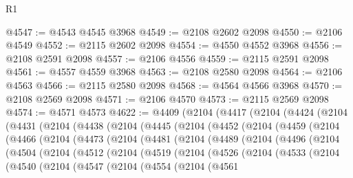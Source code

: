 \begin{lexlean}{R1}
\begin{coremodule}
@4547 := @4543 @4545 @3968
@4549 := @2108 @2602 @2098
@4550 := @2106 @4549
@4552 := @2115 @2602 @2098
@4554 := @4550 @4552 @3968
@4556 := @2108 @2591 @2098
@4557 := @2106 @4556
@4559 := @2115 @2591 @2098
@4561 := @4557 @4559 @3968
@4563 := @2108 @2580 @2098
@4564 := @2106 @4563
@4566 := @2115 @2580 @2098
@4568 := @4564 @4566 @3968
@4570 := @2108 @2569 @2098
@4571 := @2106 @4570
@4573 := @2115 @2569 @2098
@4574 := @4571 @4573
@4622 := @4409
    (@2104
      (@4417
        (@2104
          (@4424
            (@2104
              (@4431
                (@2104
                  (@4438
                    (@2104
                      (@4445
                        (@2104
                          (@4452
                            (@2104
                              (@4459
                                (@2104
                                  (@4466
                                    (@2104
                                      (@4473
                                        (@2104
                                          (@4481
                                            (@2104
                                              (@4489
                                                (@2104
                                                  (@4496
                                                    (@2104
                                                      (@4504
                                                        (@2104
                                                          (@4512
                                                            (@2104
                                                              (@4519
                                                                (@2104
                                                                  (@4526
                                                                    (@2104
                                                                      (@4533
                                                                        (@2104
                                                                          (@4540
                                                                            (@2104
                                                                              (@4547
                                                                                (@2104
                                                                                  (@4554
                                                                                    (@2104
                                                                                      (@4561

\end{coremodule}
\end{lexlean}
